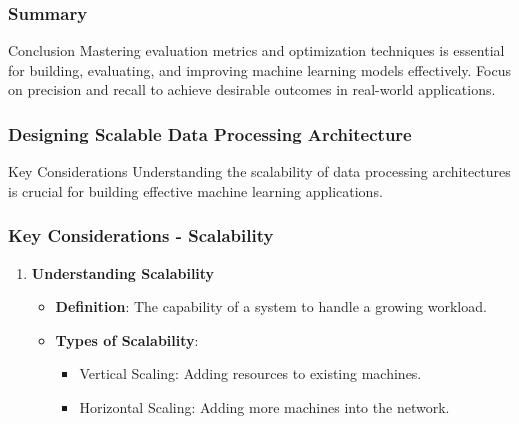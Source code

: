 \documentclass[aspectratio=169]{beamer}
\begin{document}
\begin{frame}
    \frametitle{Summary}
    \begin{block}{Conclusion}
        Mastering evaluation metrics and optimization techniques is essential for building, evaluating, and improving machine learning models effectively.
        Focus on precision and recall to achieve desirable outcomes in real-world applications.
    \end{block}
\end{frame}

\begin{frame}[fragile]
    \frametitle{Designing Scalable Data Processing Architecture}
    \begin{block}{Key Considerations}
        Understanding the scalability of data processing architectures is crucial for building effective machine learning applications.
    \end{block}
\end{frame}

\begin{frame}[fragile]
    \frametitle{Key Considerations - Scalability}
    \begin{enumerate}
        \item \textbf{Understanding Scalability}
        \begin{itemize}
            \item \textbf{Definition}: The capability of a system to handle a growing workload.
            \item \textbf{Types of Scalability}:
            \begin{itemize}
                \item Vertical Scaling: Adding resources to existing machines.
                \item Horizontal Scaling: Adding more machines into the network.
            \end{itemize}
        \end{itemize}
    \end{enumerate}
\end{frame}
\end{document}
